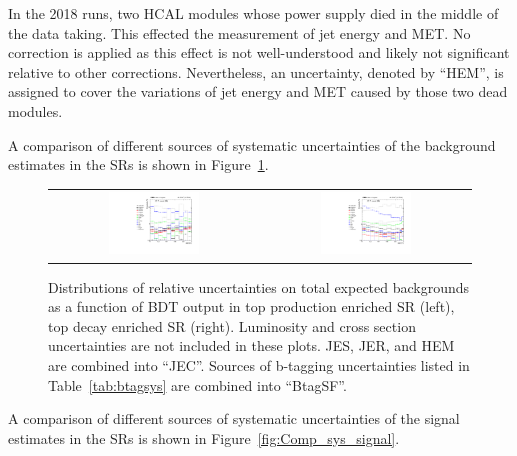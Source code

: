 In the 2018 runs, two HCAL modules whose power supply died in the middle of the data taking. This effected the measurement of jet energy and \ac{MET}. No correction is applied as this effect is not well-understood and likely not significant relative to other corrections. Nevertheless, an uncertainty, denoted by ``HEM'', is assigned to cover the variations of jet energy and \ac{MET} caused by those two dead modules. 

A comparison of different sources of systematic uncertainties of the background estimates in the \acp{SR} is shown in Figure~\ref{fig:Comp_sys_background}.

\begin{figure}[tbh!]
 \begin{center}
 \begin{tabular}{cc}
    \includegraphics[width=0.45\textwidth]{figures/Part3/Systematics/sysBDT_ST_bkg_2017}&
  \includegraphics[width=0.45\textwidth]{figures/Part3/Systematics/sysBDT_TT_bkg_2017} \\
 \end{tabular}
 \caption{Distributions of relative uncertainties on total expected backgrounds as a function of BDT output in top production enriched \ac{SR} (left), top decay enriched \ac{SR} (right). Luminosity and cross section uncertainties are not included in these plots. \ac{JES}, \ac{JER}, and HEM are combined into ``JEC''. Sources of b-tagging uncertainties listed in Table~\ref{tab:btagsys} are combined into ``BtagSF''.}
 \label{fig:Comp_sys_background}
 \end{center}
\end{figure}

A comparison of different sources of systematic uncertainties of the signal estimates in the \acp{SR} is shown in Figure~\ref{fig:Comp_sys_signal}.

